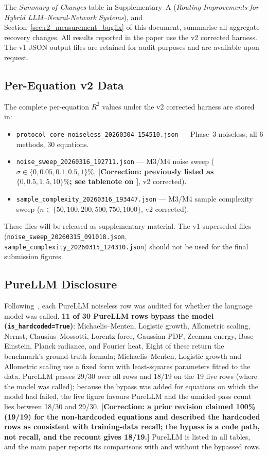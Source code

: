 \documentclass[twoside,11pt]{article}
\begin{document}
The \emph{Summary of Changes} table in Supplementary~A (\emph{Routing Improvements for Hybrid LLM--Neural-Network Systems}), and Section~\ref{sec:r2_measurement_bugfix} of this document, summarise all
aggregate recovery changes. All results reported in the paper use the
v2 corrected harness. The v1 JSON output files are retained for audit
purposes and are available upon request.

\subsection*{Per-Equation v2 Data}

The complete per-equation $R^2$ values under the v2 corrected harness are
stored in:
\begin{itemize}
  \item \texttt{protocol\_core\_noiseless\_20260304\_154510.json} —
    Phase~3 noiseless, all 6 methods, 30 equations.
  \item \texttt{noise\_sweep\_20260316\_192711.json} —
    M3/M4 noise sweep ($\sigma \in \{0, 0.05, 0.1, 0.5, 1\}\%$,
    \textbf{[Correction: previously listed as $\{0, 0.5, 1, 5, 10\}\%$;
    see tablenote on ]}, v2 corrected).
  \item \texttt{sample\_complexity\_20260316\_193447.json} —
    M3/M4 sample complexity sweep ($n \in \{50, 100, 200, 500, 750, 1000\}$,
    v2 corrected).
\end{itemize}
These files will be released as supplementary material. The v1 superseded
files (\texttt{noise\_sweep\_20260315\_091018.json},
\texttt{sample\_complexity\_20260315\_124310.json}) should not be used
for the final submission figures.

\subsection*{PureLLM Disclosure}

Following~\citet{memorization2024audit}, each PureLLM noiseless row was audited for whether the
language model was called. \textbf{11 of 30 PureLLM rows bypass the model
(\texttt{is\_hardcoded=True})}: Michaelis--Menten, Logistic growth,
Allometric scaling, Nernst, Clausius--Mossotti, Lorentz force, Gaussian PDF,
Zeeman energy, Bose--Einstein, Planck radiance, and Fourier heat. Eight of these
return the benchmark's ground-truth formula; Michaelis--Menten, Logistic growth and Allometric scaling use a fixed form with
least-squares parameters fitted to the data. PureLLM passes 29/30 over all rows and 18/19 on the 19 live rows
(where the model was called); because the bypass was added for equations on which the model had failed,
the live figure favours PureLLM and the unaided pass count lies between 18/30 and 29/30.
\textbf{[Correction: a prior revision claimed 100\% (19/19) for the non-hardcoded equations and described the
hardcoded rows as consistent with training-data recall; the bypass is a code path, not recall, and the recount
gives 18/19.]}
PureLLM is listed in all tables, and the main paper reports its comparisons with and without the bypassed rows.
\end{document}
